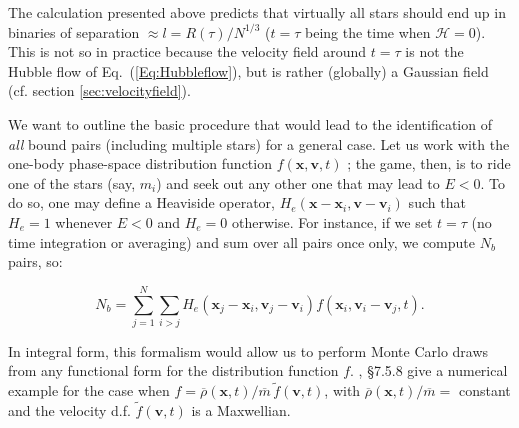  The calculation presented above predicts that virtually all stars should end up in binaries of separation 
 $\approx l = R(\tau)/N^{1/3}$ ($t = \tau$ being the time when $\mathcal{H} = 0$). This is not so in practice 
 because the velocity field around $t = \tau$ is not 
 the Hubble flow of Eq.~(\ref{Eq:Hubbleflow}), but is rather (globally) a Gaussian field (cf. section \ref{sec:velocityfield}). 
 
 
 We want to outline the basic procedure that would lead to  the identification of {\it all } bound pairs (including multiple stars) for a general case.  Let us work with the one-body phase-space distribution function $f(\mathbf{x}, \mathbf{v}, t) $ 
 ; the game, then, is to ride one of the stars (say, $m_i$) and seek out any other one that may lead to $E < 0$. To do so, one 
 may define a Heaviside operator, $H_e( \mathbf{x}- \mathbf{x}_i, \mathbf{v} - \mathbf{v}_i )$ such that 
 $H_e = 1 $ whenever $E < 0$ and $H_e = 0 $ otherwise. For instance, if we set $t = \tau$ (no time integration or 
 averaging) and sum over all pairs once only, we compute $N_b$ pairs, so: 
 
 \[  N_b = \sum_{j=1}^N \sum_{i > j} H_e(  \mathbf{x}_j- \mathbf{x}_i, \mathbf{v}_j - \mathbf{v}_i )  f(\mathbf{x}_i, \mathbf{v}_i - \mathbf{v}_j, t) . \] 
 
 In integral form, this formalism would allow us to perform Monte Carlo draws from any functional form for the distribution 
 function $f$. \cite{BT}, \S7.5.8 give a numerical example for the case when $f  = \overline{\rho}(\mathbf{x},t) / \overline{m} \, \tilde{f}(\mathbf{v},t)$, with  $\overline{\rho}(\mathbf{x},t) / \overline{m} = $ constant and the velocity d.f.  $\tilde{f}(\mathbf{v},t)$ is a Maxwellian. 
